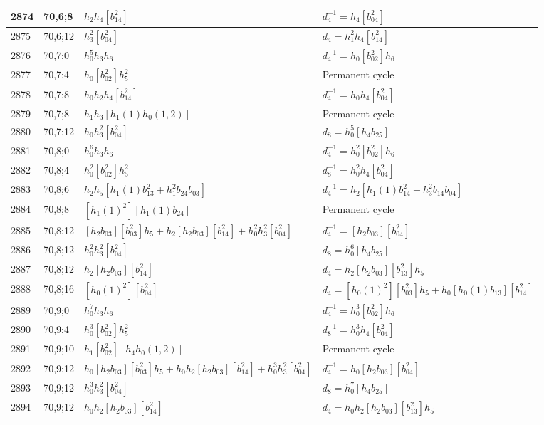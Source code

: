 \documentclass{article}
\begin{document}
\begin{longtable}{|l|l|>{\raggedright\arraybackslash}p{6cm}|>{\raggedright\arraybackslash}p{6cm}|}
\hline
2874 & 70,6;8 & $h_2h_4[b_{14}^2]$ & $d_{4}^{-1}=h_4[b_{04}^2]$\\
\hline
2875 & 70,6;12 & $h_3^2[b_{04}^2]$ &$d_{4}=h_1^2h_4[b_{14}^2]$\\
\hline
2876 & 70,7;0 & $h_0^5h_3h_6$ & $d_{4}^{-1}=h_0[b_{02}^2]h_6$\\
\hline
2877 & 70,7;4 & $h_0[b_{02}^2]h_5^2$ & Permanent cycle\\
\hline
2878 & 70,7;8 & $h_0h_2h_4[b_{14}^2]$ & $d_{4}^{-1}=h_0h_4[b_{04}^2]$\\
2879 & 70,7;8 & $h_1h_3[h_1(1)h_0(1, 2)]$ & Permanent cycle\\
\hline
2880 & 70,7;12 & $h_0h_3^2[b_{04}^2]$ &$d_{8}=h_0^5[h_4b_{25}]$\\
\hline
2881 & 70,8;0 & $h_0^6h_3h_6$ & $d_{4}^{-1}=h_0^2[b_{02}^2]h_6$\\
\hline
2882 & 70,8;4 & $h_0^2[b_{02}^2]h_5^2$ & $d_{8}^{-1}=h_0^2h_4[b_{04}^2]$\\
\hline
2883 & 70,8;6 & $h_2h_5[h_1(1)b_{13}^2 + h_1^2b_{24}b_{03}]$ & $d_{4}^{-1}=h_2[h_1(1)b_{14}^2 + h_3^2b_{14}b_{04}]$\\
\hline
2884 & 70,8;8 & $[h_1(1)^2][h_1(1)b_{24}]$ & Permanent cycle\\
\hline
2885 & 70,8;12 & $[h_2b_{03}][b_{03}^2]h_5 + h_2[h_2b_{03}][b_{14}^2] + h_0^2h_3^2[b_{04}^2]$ & $d_{4}^{-1}=[h_2b_{03}][b_{04}^2]$\\
2886 & 70,8;12 & $h_0^2h_3^2[b_{04}^2]$ &$d_{8}=h_0^6[h_4b_{25}]$\\
2887 & 70,8;12 & $h_2[h_2b_{03}][b_{14}^2]$ &$d_{4}=h_2[h_2b_{03}][b_{13}^2]h_5$\\
\hline
2888 & 70,8;16 & $[h_0(1)^2][b_{04}^2]$ &$d_{4}=[h_0(1)^2][b_{03}^2]h_5 + h_0[h_0(1)b_{13}][b_{14}^2]$\\
\hline
2889 & 70,9;0 & $h_0^7h_3h_6$ & $d_{4}^{-1}=h_0^3[b_{02}^2]h_6$\\
\hline
2890 & 70,9;4 & $h_0^3[b_{02}^2]h_5^2$ & $d_{8}^{-1}=h_0^3h_4[b_{04}^2]$\\
\hline
2891 & 70,9;10 & $h_1[b_{02}^2][h_4h_0(1, 2)]$ & Permanent cycle\\
\hline
2892 & 70,9;12 & $h_0[h_2b_{03}][b_{03}^2]h_5 + h_0h_2[h_2b_{03}][b_{14}^2] + h_0^3h_3^2[b_{04}^2]$ & $d_{4}^{-1}=h_0[h_2b_{03}][b_{04}^2]$\\
2893 & 70,9;12 & $h_0^3h_3^2[b_{04}^2]$ &$d_{8}=h_0^7[h_4b_{25}]$\\
2894 & 70,9;12 & $h_0h_2[h_2b_{03}][b_{14}^2]$ &$d_{4}=h_0h_2[h_2b_{03}][b_{13}^2]h_5$\\

\end{longtable}
\end{document}
